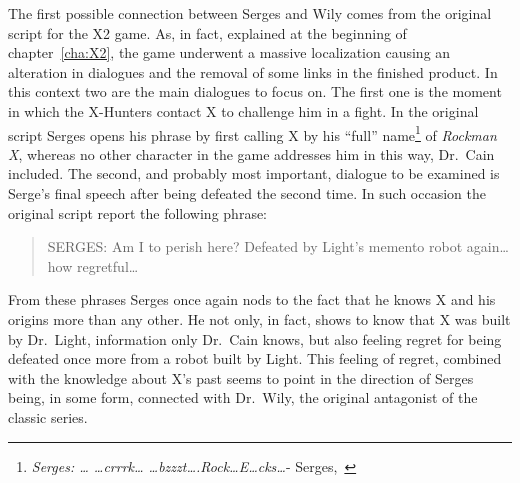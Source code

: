 The first possible connection between Serges and Wily comes from the original script for the X2 game. As, in fact, explained at the beginning of chapter~\ref{cha:X2}, the game underwent a massive localization causing an alteration in dialogues and the removal of some links in the finished product. In this context two are the main dialogues to focus on. The first one is the moment in which the X-Hunters contact X to challenge him in a fight. In the original script Serges opens his phrase by first calling X by his ``full'' name\footnote{\textit{Serges: … …crrrk… …bzzzt….Rock…E…cks…}- Serges,~\cite{wordpress:X2_japanese_script}} of \textit{Rockman X}, whereas no other character in the game addresses him in this way, Dr.~Cain included. The second, and probably most important, dialogue to be examined is Serge's final speech after being defeated the second time. In such occasion the original script report the following phrase:
\begin{quote}
	SERGES: Am I to perish here? Defeated by Light’s memento robot again… how regretful…~\cite{wordpress:X2_japanese_script}
\end{quote}
From these phrases Serges once again nods to the fact that he knows X and his origins more than any other. He not only, in fact, shows to know that X was built by Dr.~Light, information only Dr.~Cain knows, but also feeling regret for being defeated once more from a robot built by Light.  This feeling of regret, combined with the knowledge about X's past seems to point in the direction of Serges being, in some form, connected with Dr.~Wily, the original antagonist of the classic series.

